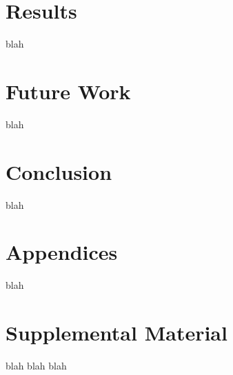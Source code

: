 \documentclass[11pt,a4paper]{article}
\begin{document}
\section{Results}

blah

\section{Future Work}

blah

\section{Conclusion}

blah




\appendix

\section{Appendices}
\label{sec:appendix}

blah 

\section{Supplemental Material}
\label{sec:supplemental}
blah blah blah
\end{document}
